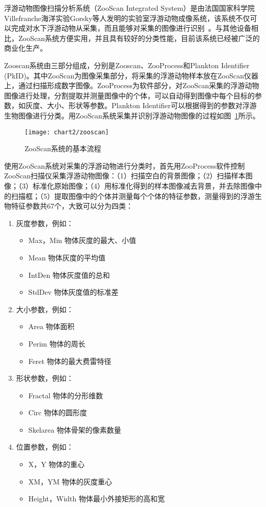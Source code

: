 浮游动物图像扫描分析系统（ZooScan Integrated System）是由法国国家科学院Villefranche海洋实验Gorsky等人发明的实验室浮游动物成像系统，该系统不仅可以完成对水下浮游动物从采集，而且能够对采集的图像进行识别~\cite{毕永坤2011基于}。与其他设备相比，ZooScan系统方便实用，并且具有较好的分类性能，目前该系统已经被广泛的商业化生产。

Zooscan系统由三部分组成，分别是Zooscan、ZooProcess和Plankton Identifier (PkID)。其中ZooScan为图像采集部分，将采集的浮游动物样本放在ZooScan仪器上，通过扫描形成数字图像。ZooProcess为软件部分，对ZooScan采集的浮游动物图像进行处理，分割提取并测量图像中的个体，可以自动得到图像中每个目标的参数，如灰度、大小、形状等参数。Plankton Identifier可以根据得到的参数对浮游生物图像进行分类。用ZooScan系统采集并识别浮游动物图像的过程如图~\ref{fig:zooscanframe}所示。
\begin{figure}[H] %
  \centering
  \texttt{[image: chart2/zooscan]}
  \caption{ZooScan系统的基本流程}
  \label{fig:zooscanframe}
\end{figure}

使用ZooScan系统对采集的浮游动物进行分类时，首先用ZooProcess软件控制ZooScan扫描仪采集浮游动物图像：（1）扫描空白的背景图像；（2）扫描样本图像；（3）标准化原始图像；（4）用标准化得到的样本图像减去背景，并去除图像中的扫描框；（5）提取图像中的个体并测量每个个体的特征参数，测量得到的浮游生物特征参数共67个，大致可以分为四类：
\begin{enumerate}
\item 灰度参数，例如：
  \begin{itemize}
  \item Max，Min 物体灰度的最大、小值
  \item Mean 物体灰度的平均值
  \item IntDen 物体灰度值的总和
  \item StdDev 物体灰度值的标准差
  \end{itemize}
\item 大小参数，例如：
  \begin{itemize}
  \item Area 物体面积
  \item Perim 物体的周长
  \item Feret 物体的最大费雷特径
  \end{itemize}
\item 形状参数，例如：
  \begin{itemize}
  \item Fractal 物体的分形维数
  \item Circ 物体的圆形度
  \item Skelarea 物体骨架的像素数量
  \end{itemize}
\item 位置参数，例如：
  \begin{itemize}
  \item X，Y 物体的重心
  \item XM，YM 物体的灰度重心
  \item Height，Width 物体最小外接矩形的高和宽
  \end{itemize}
\end{enumerate}

